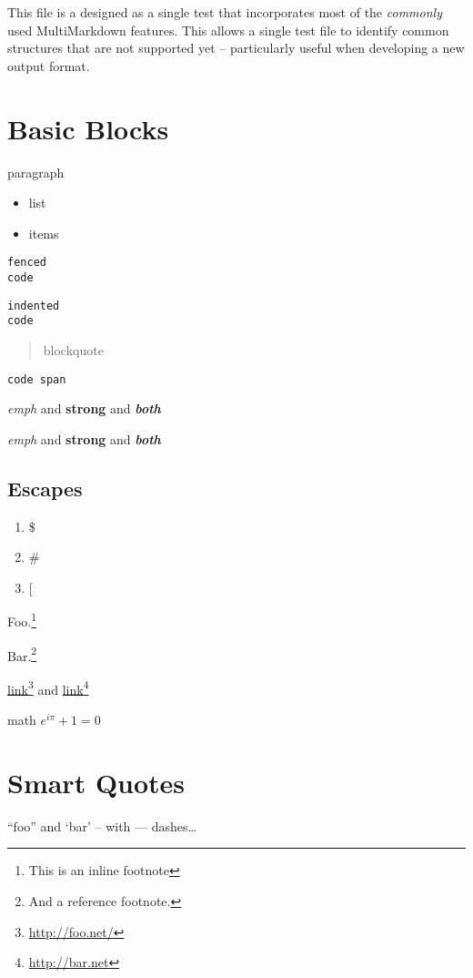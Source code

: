 This file is a designed as a single test that incorporates most of the
\emph{commonly} used MultiMarkdown features. This allows a single test file to
identify common structures that are not supported yet -- particularly useful
when developing a new output format.

\part{Basic Blocks }
\label{basicblocks}

paragraph

\begin{itemize}
\item list

\item items

\end{itemize}

\begin{verbatim}
fenced
code
\end{verbatim}

\begin{verbatim}
indented
code
\end{verbatim}

\begin{quote}
blockquote
\end{quote}

\texttt{code span}

\emph{emph} and \textbf{strong} and \textbf{\emph{both}}

\emph{emph} and \textbf{strong} and \textbf{\emph{both}}

\chapter{Escapes }
\label{escaped}

\begin{enumerate}
\item \$

\item \#

\item [

\end{enumerate}

Foo.\footnote{This is an inline footnote}

Bar.\footnote{And a reference footnote.}

\href{http://foo.net/}{link}\footnote{\href{http://foo.net/}{http:/\slash foo.net\slash }} and \href{http://bar.net}{link}\footnote{\href{http://bar.net}{http:/\slash bar.net}}

math ${e}^{i\pi }+1=0$

\part{Smart Quotes }
\label{smartquotes}

``foo'' and `bar' -- with --- dashes{\ldots}
